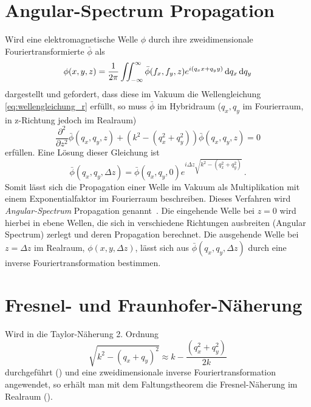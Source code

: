 \section{Angular-Spectrum Propagation}
Wird eine elektromagnetische Welle $\phi$ durch ihre zweidimensionale Fouriertransformierte $\bar{\phi}$ als
\begin{equation}
	\phi(x,y,z)=\frac{1}{2\pi}\iint_{-\infty}^{\infty}\bar{\phi}(f_x,f_y,z)e^{i(q_xx+q_yy)} \dif q_x \dif q_y
\end{equation}dargestellt und gefordert, dass diese im Vakuum die Wellengleichung \eqref{eq:wellengleichung_r} erfüllt,
so muss $\bar{\phi}$ im Hybridraum ($q_x,q_y$ im Fourierraum, in z-Richtung jedoch im Realraum)
\begin{equation}
	\label{eq:wellengleichung_h}
	\frac{\partial ^2}{\partial z^2}\bar{\phi}(q_x,q_y,z)+ \left(k^2-\left(q_x^2+q_y^2\right)\right)\bar{\phi}(q_x,q_y,z)=0
\end{equation}
erfüllen. Eine Lösung dieser Gleichung ist
\begin{equation}
	\label{eq:angularspectrum}
	\bar{\phi}\left(q_x,q_y,\Delta z\right)=\bar{\phi}(q_x,q_y,0)e^{i\Delta z\sqrt{k^2-(q_x^2+q_y^2)}}\, . 
\end{equation}
Somit lässt sich die Propagation einer Welle im Vakuum als Multiplikation mit einem Exponentialfaktor im Fourierraum beschreiben. Dieses Verfahren wird \textit{Angular-Spectrum} Propagation genannt~\cite{goodman2005}. Die eingehende Welle bei $z=0$ wird hierbei in ebene Wellen, die sich in verschiedene Richtungen ausbreiten (Angular Spectrum) zerlegt und deren Propagation berechnet. Die ausgehende Welle bei $z=\Delta z$ im Realraum, $\phi\left(x,y,\Delta z\right)$, lässt sich aus $\bar{\phi}\left(q_x,q_y,\Delta z\right)$ durch eine inverse Fouriertransformation bestimmen.


\section{Fresnel- und Fraunhofer-Näherung}
\label{chap:fraunhofer}
Wird in  die Taylor-Näherung 2. Ordnung
\begin{equation}
	\sqrt{k^2-(q_x+q_y)^2}\approx k-\frac{(q_x^2+q_y^2)}{2k}
\end{equation}
durchgeführt () und eine zweidimensionale inverse Fouriertransformation angewendet, so erhält man mit dem Faltungstheorem die Fresnel-Näherung im Realraum ().

